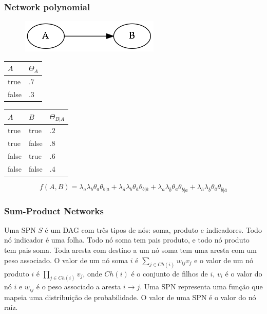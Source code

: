 \documentclass[10pt]{beamer}
\theoremstyle{plain}
\begin{document}
\begin{frame}
  \frametitle{Network polynomial}

  \begin{figure}[h]
    \centering\includegraphics[scale=0.3]{imgs/simple_bn.png}
  \end{figure}

  \begin{table}[h]
    \begin{center}
      \begin{tabular}{l | l}
        $A$ & $\Theta_A$ \\
        \hline
        true & $.7$ \\
        false & $.3$ \\
      \end{tabular}
      \begin{tabular}{l l | l}
        $A$ & $B$ & $\Theta_{B|A}$ \\
        \hline
        true & true & $.2$ \\
        true & false & $.8$ \\
        false & true & $.6$ \\
        false & false & $.4$ \\
      \end{tabular}
    \end{center}
  \end{table}


  \begin{equation*}
    f(A,B)=\lambda_a\lambda_b\theta_a\theta_{b|a}+\lambda_{\overline{a}}\lambda_b
    \theta_{\overline{a}}\theta_{b|\overline{a}}+\lambda_a\lambda_{\overline{b}}\theta_a
    \theta_{\overline{b}|a}+\lambda_{\overline{a}}\lambda_{\overline{b}}
    \theta_{\overline{a}}\theta_{\overline{b}|\overline{a}}
  \end{equation*}
\end{frame}

\begin{frame}
  \frametitle{Sum-Product Networks}
  \begin{definition}
  Uma SPN $S$ é um DAG com três tipos de nós: soma, produto e indicadores. Todo nó indicador é uma
  folha. Todo nó soma tem pais produto, e todo nó produto tem pais soma. Toda aresta com destino a
  um nó soma tem uma aresta com um peso associado. O valor de um nó soma $i$ é $\sum_{j\in Ch(i)}
  w_{ij}v_j$ e o valor de um nó produto $i$ é $\prod_{j\in Ch(i)}v_j$, onde $Ch(i)$ é o conjunto
  de filhos de $i$, $v_i$ é o valor do nó $i$ e $w_{ij}$ é o peso associado a aresta $i\to j$. Uma
  SPN representa uma função que mapeia uma distribuição de probabilidade. O valor de uma SPN é o
  valor do nó raíz.
  \end{definition}
\end{frame}
\end{document}
